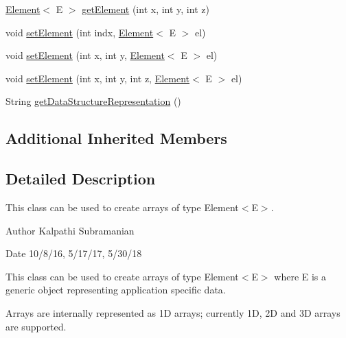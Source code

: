 \begin{DoxyCompactItemize}
\mbox{\hyperlink{classbridges_1_1base_1_1_element}{Element}}$<$ E $>$ \mbox{\hyperlink{classbridges_1_1base_1_1_array_a09b5bd2d3b4cd12aea34b5e62b5e801a}{get\+Element}} (int x, int y, int z)
\item 
void \mbox{\hyperlink{classbridges_1_1base_1_1_array_aafde1304d602e8b0f673dd61bc00c18f}{set\+Element}} (int indx, \mbox{\hyperlink{classbridges_1_1base_1_1_element}{Element}}$<$ E $>$ el)
\item 
void \mbox{\hyperlink{classbridges_1_1base_1_1_array_a5e43e6d56cfeaf6a1b193b0ea16f7696}{set\+Element}} (int x, int y, \mbox{\hyperlink{classbridges_1_1base_1_1_element}{Element}}$<$ E $>$ el)
\item 
void \mbox{\hyperlink{classbridges_1_1base_1_1_array_adce72de13986516fb3130113d85dbe36}{set\+Element}} (int x, int y, int z, \mbox{\hyperlink{classbridges_1_1base_1_1_element}{Element}}$<$ E $>$ el)
\item 
String \mbox{\hyperlink{classbridges_1_1base_1_1_array_a111592e8b75202064bdf06d9c2234d74}{get\+Data\+Structure\+Representation}} ()
\end{DoxyCompactItemize}
\subsection*{Additional Inherited Members}


\subsection{Detailed Description}
This class can be used to create arrays of type Element$<$\+E$>$. 

\begin{DoxyAuthor}{Author}
Kalpathi Subramanian
\end{DoxyAuthor}
\begin{DoxyDate}{Date}
10/8/16, 5/17/17, 5/30/18
\end{DoxyDate}
This class can be used to create arrays of type Element$<$\+E$>$ where E is a generic object representing application specific data.

Arrays are internally represented as 1D arrays; currently 1D, 2D and 3D arrays are supported.


